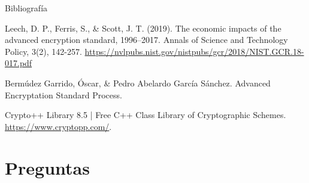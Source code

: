 \documentclass{beamer}
\begin{document}
\begin{frame}[allowframebreaks]{Bibliografía}
\begin{thebibliography}{9}

	Leech, D. P., Ferris, S., \& Scott, J. T. (2019). The economic impacts of the advanced encryption standard, 1996–2017. Annals of Science and Technology Policy, 3(2), 142-257. \url{https://nvlpubs.nist.gov/nistpubs/gcr/2018/NIST.GCR.18-017.pdf}



	Bermúdez Garrido, Óscar, \& Pedro Abelardo García Sánchez. Advanced Encryptation Standard Process.



	Crypto++ Library 8.5 | Free C++ Class Library of Cryptographic Schemes. \url{https://www.cryptopp.com/}.


\end{thebibliography}


\end{frame}

\section{Preguntas}
\end{document}
